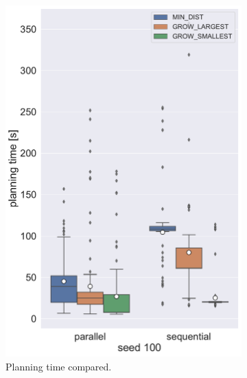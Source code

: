 \begin{figure}
	\centering
	\begin{subfigure}[h]{0.5\textwidth}
		\centering
		\includegraphics[width=\textwidth]{figures/plots/AR_parseq_time.pdf}
		\caption{Planning time compared.}
		\label{fig:AR_parseq_time}
	\end{subfigure}%
	\begin{subfigure}[h]{0.5\textwidth}
		\centering

\end{subfigure}
\end{figure}
